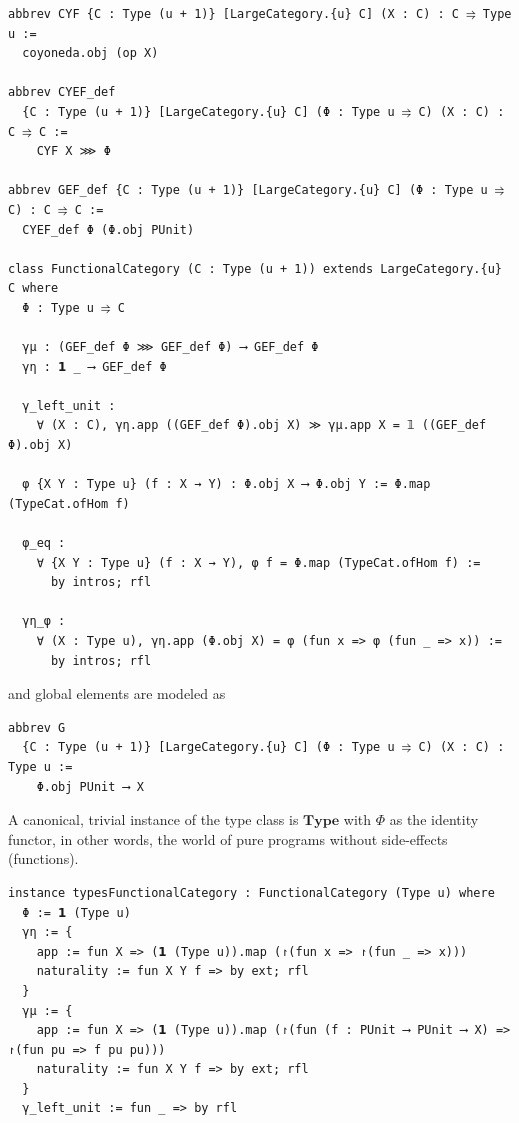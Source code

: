 \documentclass{article}
\begin{document}
\vspace{6pt}
\begin{lstlisting}[basicstyle=\tiny]
abbrev CYF {C : Type (u + 1)} [LargeCategory.{u} C] (X : C) : C ⥤ Type u :=
  coyoneda.obj (op X)

abbrev CYEF_def 
  {C : Type (u + 1)} [LargeCategory.{u} C] (Φ : Type u ⥤ C) (X : C) : C ⥤ C :=
    CYF X ⋙ Φ

abbrev GEF_def {C : Type (u + 1)} [LargeCategory.{u} C] (Φ : Type u ⥤ C) : C ⥤ C :=
  CYEF_def Φ (Φ.obj PUnit)

class FunctionalCategory (C : Type (u + 1)) extends LargeCategory.{u} C where
  Φ : Type u ⥤ C

  γμ : (GEF_def Φ ⋙ GEF_def Φ) ⟶ GEF_def Φ
  γη : 𝟭 _ ⟶ GEF_def Φ

  γ_left_unit : 
    ∀ (X : C), γη.app ((GEF_def Φ).obj X) ≫ γμ.app X = 𝟙 ((GEF_def Φ).obj X)

  φ {X Y : Type u} (f : X → Y) : Φ.obj X ⟶ Φ.obj Y := Φ.map (TypeCat.ofHom f)

  φ_eq : 
    ∀ {X Y : Type u} (f : X → Y), φ f = Φ.map (TypeCat.ofHom f) := 
      by intros; rfl

  γη_φ :
    ∀ (X : Type u), γη.app (Φ.obj X) = φ (fun x => φ (fun _ => x)) :=
      by intros; rfl
\end{lstlisting}
\vspace{6pt}

and global elements are modeled as

\vspace{6pt}
\begin{lstlisting}[basicstyle=\tiny]
abbrev G 
  {C : Type (u + 1)} [LargeCategory.{u} C] (Φ : Type u ⥤ C) (X : C) : Type u :=
    Φ.obj PUnit ⟶ X
\end{lstlisting}
\vspace{6pt}

A canonical, trivial instance of the type class is $\mathbf{Type}$ with $\Phi$ as the identity
functor, in other words, the world of pure programs without side-effects (functions).

\vspace{6pt}
\begin{lstlisting}[basicstyle=\tiny]
instance typesFunctionalCategory : FunctionalCategory (Type u) where
  Φ := 𝟭 (Type u)
  γη := {
    app := fun X => (𝟭 (Type u)).map (↾(fun x => ↾(fun _ => x)))
    naturality := fun X Y f => by ext; rfl
  }
  γμ := {
    app := fun X => (𝟭 (Type u)).map (↾(fun (f : PUnit ⟶ PUnit ⟶ X) => ↾(fun pu => f pu pu)))
    naturality := fun X Y f => by ext; rfl
  }
  γ_left_unit := fun _ => by rfl
\end{lstlisting}
\vspace{6pt}
\end{document}

